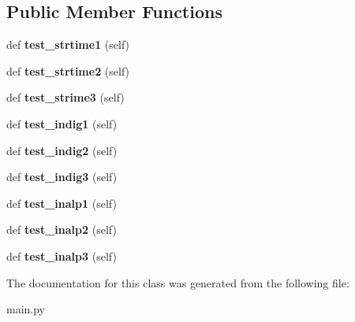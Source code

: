 \subsection*{Public Member Functions}
\begin{DoxyCompactItemize}
\item 
\hypertarget{classmain_1_1_testcases_a997fa2d1a3b7f5db020cfea3feedd300}{}def {\bfseries test\+\_\+strtime1} (self)\label{classmain_1_1_testcases_a997fa2d1a3b7f5db020cfea3feedd300}

\item 
\hypertarget{classmain_1_1_testcases_a5b29052d44fd7fb6d56fd13aeb792c56}{}def {\bfseries test\+\_\+strtime2} (self)\label{classmain_1_1_testcases_a5b29052d44fd7fb6d56fd13aeb792c56}

\item 
\hypertarget{classmain_1_1_testcases_afbad295f51840c173f3e7690935f9424}{}def {\bfseries test\+\_\+strime3} (self)\label{classmain_1_1_testcases_afbad295f51840c173f3e7690935f9424}

\item 
\hypertarget{classmain_1_1_testcases_acc017228af55dfa3c1c5e4f19de854c2}{}def {\bfseries test\+\_\+indig1} (self)\label{classmain_1_1_testcases_acc017228af55dfa3c1c5e4f19de854c2}

\item 
\hypertarget{classmain_1_1_testcases_ac7f2dbda87e66d24356900b3985ecb83}{}def {\bfseries test\+\_\+indig2} (self)\label{classmain_1_1_testcases_ac7f2dbda87e66d24356900b3985ecb83}

\item 
\hypertarget{classmain_1_1_testcases_ac576db962dbc29dcb11012f0b6c1629c}{}def {\bfseries test\+\_\+indig3} (self)\label{classmain_1_1_testcases_ac576db962dbc29dcb11012f0b6c1629c}

\item 
\hypertarget{classmain_1_1_testcases_aa8edc9b067e7c380bb6c6512f74c8b91}{}def {\bfseries test\+\_\+inalp1} (self)\label{classmain_1_1_testcases_aa8edc9b067e7c380bb6c6512f74c8b91}

\item 
\hypertarget{classmain_1_1_testcases_a45fa7057bf102da0a7780844291701d8}{}def {\bfseries test\+\_\+inalp2} (self)\label{classmain_1_1_testcases_a45fa7057bf102da0a7780844291701d8}

\item 
\hypertarget{classmain_1_1_testcases_a8b1c6ed146c459bffe7547507098ccfc}{}def {\bfseries test\+\_\+inalp3} (self)\label{classmain_1_1_testcases_a8b1c6ed146c459bffe7547507098ccfc}

\end{DoxyCompactItemize}


The documentation for this class was generated from the following file\+:\begin{DoxyCompactItemize}
\item 
main.\+py\end{DoxyCompactItemize}
